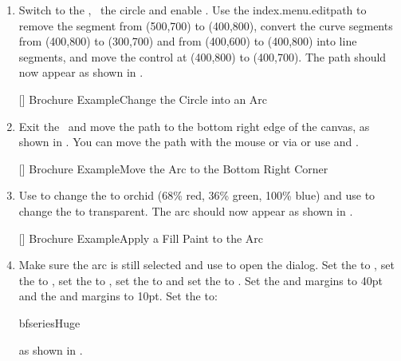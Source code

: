 \begin{enumerate}
[]
{}
{Brochure Example\dash Draw a Circle}

\item Switch to the , \select\ the circle and enable
\editpathmode. Use the \gls{index.menu.editpath} to remove the
segment from (500,700) to (400,800), convert the curve segments from
(400,800) to (300,700) and from (400,600) to (400,800) into line
segments, and move the control at (400,800) to (400,700). The
\gls{path} should now appear as shown in .

[]
{}
{Brochure Example\dash Change the Circle into an Arc}

\item Exit the \editpathmode\ and move the \gls*{path} to the bottom
right edge of the \gls{canvas}, as shown in
. You can move the \gls*{path} with the
mouse or via  or use
 and
.

[]
{}
{Brochure Example\dash Move the Arc to the Bottom Right Corner}

\item Use  to change the 
 to orchid (68\% red, 36\% green, 100\% blue) and use
 to change the 
to \gls{transparent}. The arc should now appear as shown in
.

[]
{}
{Brochure Example\dash Apply a Fill Paint to the Arc}

\item Make sure the arc is still selected and
use  to open the
 dialog. Set the
 to
, set the
 to , set the
 to
,
set the  to
 and set the
 to
.  Set the
 and
 margins to 40\gls{pt} and the
 and
 margins to 10\gls{pt}.
Set the  to:
\begin{compactcodebox*}
\gls{bfseries}\gls{Huge}
\end{compactcodebox*}%
as shown in .


\end{enumerate}
